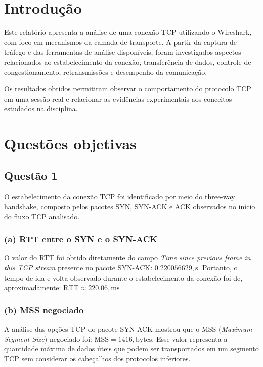 \documentclass[
    12pt,
    a4paper,
    oneside
]{article}
\begin{document}
\section{Introdução}

Este relatório apresenta a análise de uma conexão TCP utilizando o Wireshark, com foco em mecanismos da camada de transporte. A partir da captura de tráfego e das ferramentas de análise disponíveis, foram investigados aspectos relacionados ao estabelecimento da conexão, transferência de dados, controle de congestionamento, retransmissões e desempenho da comunicação.

Os resultados obtidos permitiram observar o comportamento do protocolo TCP em uma sessão real e relacionar as evidências experimentais aos conceitos estudados na disciplina.

\section{Questões objetivas}

\subsection{Questão 1}
O estabelecimento da conexão TCP foi identificado por meio do three-way handshake, composto pelos pacotes SYN, SYN-ACK e ACK observados no início do fluxo TCP analisado.

\subsubsection*{(a) RTT entre o SYN e o SYN-ACK}

O valor do RTT foi obtido diretamente do campo \textit{Time since previous frame in this TCP stream} presente no pacote SYN-ACK: \(0.220056629,\mathrm{s}\). Portanto, o tempo de ida e volta observado durante o estabelecimento da conexão foi de, aproximadamente: \(\mathrm{RTT}\approx220.06,\mathrm{ms}\)

\subsubsection*{(b) MSS negociado}

A análise das opções TCP do pacote SYN-ACK mostrou que o MSS (\textit{Maximum Segment Size}) negociado foi: \(\mathrm{MSS}=1416,\mathrm{bytes}\). Esse valor representa a quantidade máxima de dados úteis que podem ser transportados em um segmento TCP sem considerar os cabeçalhos dos protocolos inferiores.
\end{document}
